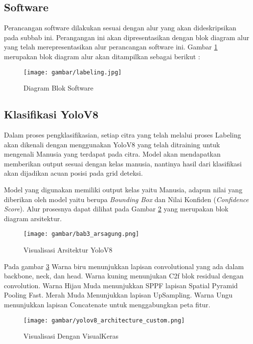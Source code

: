 \subsection{Software}
Perancangan software dilakukan sesuai dengan alur yang akan dideskripsikan pada subbab ini. Perangangan ini akan dipresentasikan dengan blok diagram alur yang telah merepresentasikan alur perancangan software ini. Gambar \ref{fig:Diagram Software.} merupakan blok diagram alur akan ditampilkan sebagai berikut :

\begin{figure}[H]
    \centering
    \texttt{[image: gambar/labeling.jpg]}
    \caption{Diagram Blok Software}
    \label{fig:Diagram Software.}
\end{figure}

\subsection{Klasifikasi YoloV8}
Dalam proses pengklasifikasian, setiap citra yang telah melalui proses Labeling akan dikenali dengan menggunakan YoloV8 yang telah ditraining untuk mengenali Manusia yang terdapat pada citra. Model akan mendapatkan memberikan output sesuai dengan kelas manusia, nantinya hasil dari klasifikasi akan dijadikan acuan posisi pada grid deteksi.

Model yang digunakan memiliki output kelas yaitu Manusia, adapun nilai yang diberikan oleh model yaitu berupa \emph{Bounding Box} dan Nilai Konfiden (\emph{Confidence Score}). Alur prosesnya dapat dilihat pada Gambar \ref{fig:Visualisasi Arsitektur YoloV8} yang merupakan blok diagram arsitektur.
\begin{figure}[H]
  \centering
  \texttt{[image: gambar/bab3\_arsagung.png]}
  \caption{Visualisasi Arsitektur YoloV8}
  \label{fig:Visualisasi Arsitektur YoloV8}
\end{figure}

Pada gambar \ref{fig:Visualisasi Arsitektur YoloV8 VisualKeras} Warna biru menunjukkan lapisan convolutional yang ada dalam backbone, neck, dan head. Warna kuning menunjukan C2f blok residual dengan convolution. Warna Hijau Muda menunjukkan SPPF lapisan Spatial Pyramid Pooling Fast. Merah Muda Menunjukkan lapisan UpSampling. Warna Ungu menunjukkan lapisan Concatenate untuk menggabungkan peta fitur.

\begin{figure}[H]
  \centering
  \texttt{[image: gambar/yolov8\_architecture\_custom.png]}
  \caption{Visualisasi Dengan VisualKeras}
  \label{fig:Visualisasi Arsitektur YoloV8 VisualKeras}
\end{figure}


